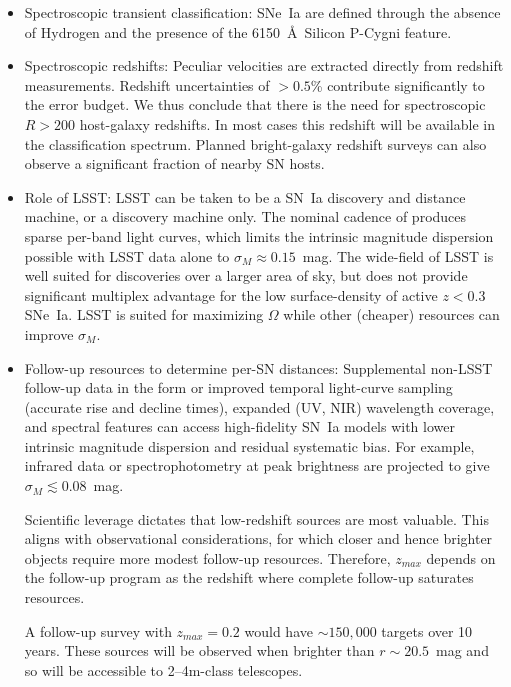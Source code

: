 \documentclass{aastex62}   	%
\begin{document}
\begin{itemize}
\item Spectroscopic transient classification:  SNe~Ia are defined through the absence of Hydrogen and the presence of the 6150~\AA~Silicon P-Cygni feature.
\item Spectroscopic redshifts:  Peculiar velocities are extracted directly from redshift measurements.  Redshift uncertainties of $>0.5$\% contribute significantly
to the error budget.  We thus conclude that there is the need for spectroscopic $R>200$ host-galaxy redshifts.  In most cases this redshift will be
available in the classification spectrum.  Planned bright-galaxy redshift surveys can also observe a significant fraction of nearby SN hosts.
\item Role of LSST:
LSST can be taken to be a SN~Ia discovery and distance machine, or a discovery machine only.   The nominal cadence of 
 produces sparse per-band light curves, which limits the intrinsic magnitude dispersion possible with LSST data alone to $\sigma_M \approx 0.15$~mag.
The wide-field of LSST is
 well suited for discoveries over a larger area of sky, but does not provide significant multiplex advantage for the low surface-density of active
$z<0.3$ SNe~Ia.  LSST is  suited for maximizing $\Omega$ while other (cheaper) resources can improve $\sigma_M$.
\item Follow-up resources to determine per-SN distances:
Supplemental non-LSST follow-up data in the form or improved temporal light-curve sampling (accurate rise and decline times), 
expanded (UV, NIR) wavelength coverage, and spectral features
can access high-fidelity SN~Ia models with lower intrinsic magnitude dispersion and residual systematic bias.
For example, infrared data \citep{2012MNRAS.425.1007B} or spectrophotometry at peak brightness
 \citep{2015ApJ...815...58F} are projected to give $\sigma_M \lesssim 0.08$~mag.

Scientific leverage dictates that low-redshift sources are most valuable.
This aligns with observational considerations, for which closer and hence brighter objects require more modest follow-up resources.
Therefore, $z_{max}$ depends on the follow-up program as the redshift where complete follow-up saturates resources.

A follow-up survey with $z_{max}=0.2$ would have $\sim 150,000$ targets over 10 years.  These sources will be observed when
brighter than $r \sim 20.5$~mag and so will be accessible to 2--4m-class telescopes.  
\end{itemize}
\end{document}
